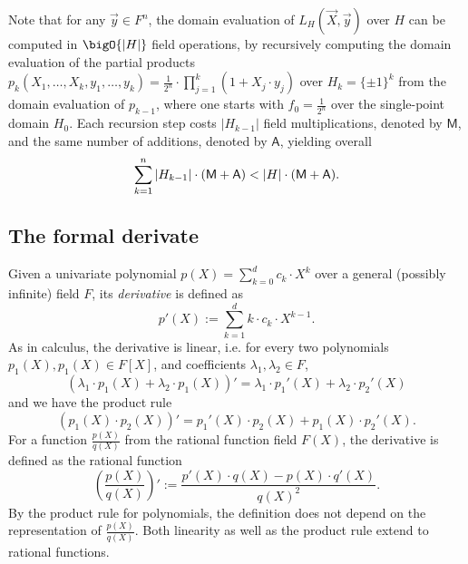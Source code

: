 \documentclass[11pt]{article}
\theoremstyle{definition}
\theoremstyle{remark}
\begin{document}
Note that for any $\vec y\in F^n$, the domain evaluation of $L_H(\vec X, \vec y)$ over $H$ can be computed in 
$\bigO{|H|}$ field operations, by recursively computing the domain evaluation of the partial products 
$
p_k(X_1,\ldots, X_k, y_1,\ldots, y_k)= \frac{1}{2^n}\cdot \prod_{j=1}^k (1 + X_j\cdot y_j)
$ 
over $H_k =\{\pm 1\}^k$ from the domain evaluation of $p_{k-1}$, where one starts with $f_0 = \frac{1}{2^n}$ over the single-point domain $H_0$.
Each recursion step costs $|H_{k-1}|$ field multiplications, denoted by $\mathsf M$, and the same number of additions, denoted by $\mathsf A$,  yielding overall
\begin{equation}
\label{e:lagrange:cost}
\sum_{k=1}^{n} |H_{k-1}| \cdot (\textsf M + \textsf A) < |H| \cdot  (\textsf M + \textsf A).
\end{equation}


\subsection{The formal derivate}

Given a univariate polynomial $p(X) =\sum_{k=0}^{d} c_k\cdot X^k$ over a general (possibly infinite) field $F$, its \textit{derivative} is defined as 
\begin{equation}
\label{e:DerivativePoly}
p'(X) := \sum_{k=1}^{d} k \cdot c_k \cdot X^{k-1}.
\end{equation}
As in calculus, the derivative is linear, i.e. for every two polynomials $p_1(X), p_1(X)\in F[X]$, and coefficients $\lambda_1,\lambda_2\in F$,
\begin{equation*}
(\lambda_1 \cdot p_1(X) + \lambda_2 \cdot p_1(X))' = \lambda_1\cdot p_1'(X) + \lambda_2\cdot p_2'(X)
\end{equation*}
 and we have the product rule
\begin{equation*}
(p_1(X)\cdot p_2(X))' = p_1'(X)\cdot p_2(X) + p_1(X)\cdot p_2'(X).
\end{equation*}
For a function $\frac{p(X)}{q(X)}$ from the rational function field $F(X)$, the derivative is defined as the rational function
\begin{equation}
\label{e:DerivativeQuotient}
\left(\frac{p(X)}{q(X)}\right)' := \frac{p'(X)\cdot q(X) - p(X)\cdot q'(X)}{q(X)^2}.
\end{equation}
By the product rule for polynomials, the definition does not depend on the representation of $\frac{p(X)}{q(X)}$.
Both linearity as well as the product rule extend to rational functions. 
\end{document}
